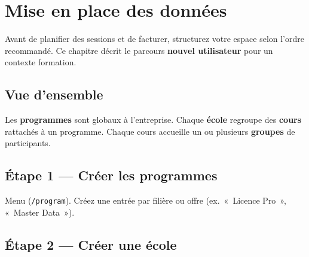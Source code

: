 \chapter{Mise en place des données}
\label{ch:mise-en-place}

Avant de planifier des sessions et de facturer, structurez votre espace selon l'ordre recommandé. Ce chapitre décrit le parcours \textbf{nouvel utilisateur} pour un contexte formation.

\section{Vue d'ensemble}

\begin{center}
\end{center}

Les \textbf{programmes} sont globaux à l'entreprise. Chaque \textbf{école} regroupe des \textbf{cours} rattachés à un programme. Chaque cours accueille un ou plusieurs \textbf{groupes} de participants.

\section{Étape 1 — Créer les programmes}

\begin{workflowstep}[Programmes]
  Menu  (\texttt{/program}). Créez une entrée par filière ou offre (ex.~«~Licence Pro~», «~Master Data~»).
\end{workflowstep}


\section{Étape 2 — Créer une école}

